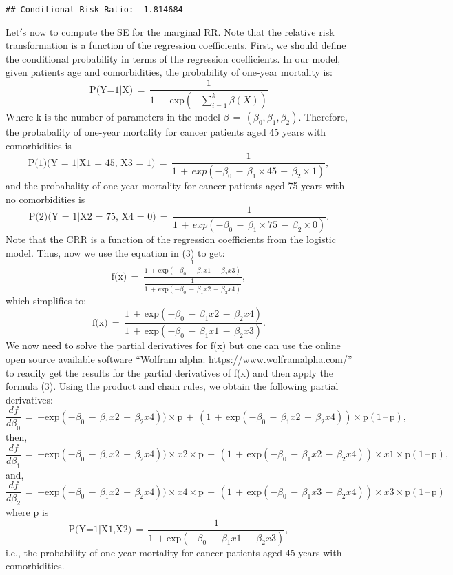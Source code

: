 \documentclass[]{article}
\begin{document}
\begin{verbatim}
## Conditional Risk Ratio:  1.814684
\end{verbatim}

Let\('\)s now to compute the SE for the marginal RR. Note that the
relative risk transformation is a function of the regression
coefficients. First, we should define the conditional probability in
terms of the regression coefficients. In our model, given patients age
and comorbidities, the probability of one-year mortality is:
\[\text{P(Y=1|X)}\,=\,\frac{1}{1\,+\,\text{exp}(−\sum_{i=1}^k \beta(X))}\]
Where k is the number of parameters in the model
\(\beta\,=\,(\beta_{0},\beta_{1},\beta_{2})\). Therefore, the
probabality of one-year mortality for cancer patients aged 45 years with
comorbidities is
\[\text{P(1)(Y = 1|X1 = 45, X3 = 1)}\,=\,\frac{1}{1\,+\,exp(−\beta_{0}\,-\,\beta_{1}\times 45\,-\,\beta_{2}\times 1)},\]
and the probabality of one-year mortality for cancer patients aged 75
years with no comorbidities is
\[\text{P(2)(Y = 1|X2 = 75, X4 = 0)}\,=\,\frac{1}{1\,+\,exp(−\beta_{0}\,-\,\beta_{1}\times 75\,-\,\beta_{2}\times 0)}.\]
Note that the CRR is a function of the regression coefficients from the
logistic model. Thus, now we use the equation in (3) to get:
\[\text{f(x)}\,=\,\frac{\frac{1}{1\,+\,\text{exp}(−\beta_{0}\,-\,\beta_{1}x1\,-\,\beta_{2} x3)}}{\frac{1}{1\,+\,\text{exp}(−\beta_{0}\,-\,\beta_{1}x2\,-\,\beta_{2}x4)}},\]
which simplifies to:
\[\text{f(x)}\,=\,\frac{1\,+\,\text{exp}(−\beta_{0}\,-\,\beta_{1}x2\,-\,\beta_{2} x4)}{1\,+\,\text{exp}(−\beta_{0}\,-\,\beta_{1}x1\,-\,\beta_{2}x3)}.\]
We now need to solve the partial derivatives for f(x) but one can use
the online open source available software ``Wolfram alpha:
\url{https://www.wolframalpha.com/}'' to readily get the results for the
partial derivatives of f(x) and then apply the formula (3). Using the
product and chain rules, we obtain the following partial derivatives:
\[\frac{df}{d\beta_{0}}\,=\,\text{−exp}(−\beta_{0}\,-\,\beta_{1}x2\,-\,\beta_{2} x4))\times \text{p}\,+\,(1\,+\,\text{exp}(−\beta_{0}\,-\,\beta_{1}x2\,-\,\beta_{2} x4))\times \text{p}(1\,–\,\text{p}),\]
then,
\[\frac{df}{d\beta_{1}}\,=\,\text{−exp}(−\beta_{0}\,-\,\beta_{1}x2\,-\,\beta_{2} x4))\times x2 \times \text{p}\,+\,(1\,+\,\text{exp}(−\beta_{0}\,-\,\beta_{1}x2\,-\,\beta_{2} x4))\times x1 \times \text{p}(1\,–\,\text{p}),\]
and,
\[\frac{df}{d\beta_{2}}\,=\,\text{−exp}(−\beta_{0}\,-\,\beta_{1}x2\,-\,\beta_{2} x4))\times x4 \times \text{p}\,+\,(1\,+\,\text{exp}(−\beta_{0}\,-\,\beta_{1}x3\,-\,\beta_{2} x4))\times x3 \times \text{p}(1\,–\,\text{p})\]
where p is
\[\text{P(Y=1|X1,X2)}\,=\,\frac{1}{1\,+\text{exp}(−\beta_{0}\,-\,\beta_{1}x1\,-\,\beta_{2}x3)},\]
i.e., the probability of one-year mortality for cancer patients aged 45
years with comorbidities.
\end{document}
